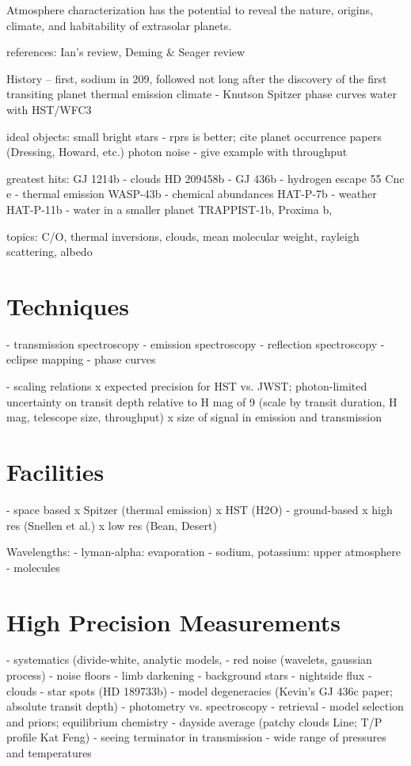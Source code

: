 \documentclass[graybox,natbib,nosecnum]{svmult}
\begin{document}
Atmosphere characterization has the potential to reveal the nature, origins, climate, and habitability of extrasolar planets.

references: Ian's review, Deming \& Seager review

History -- first, sodium in 209, followed not long after the discovery of the first transiting planet
		thermal emission 
		climate - Knutson Spitzer phase curves
		water with HST/WFC3

ideal objects:
	small bright stars - rprs is better; cite planet occurrence papers (Dressing, Howard, etc.)
	photon noise - give example with throughput

greatest hits:
	GJ 1214b - clouds
	HD 209458b -
	GJ 436b - hydrogen escape
	55 Cnc e - thermal emission
	WASP-43b - chemical abundances 
	HAT-P-7b - weather
	HAT-P-11b - water in a smaller planet 
	TRAPPIST-1b, Proxima b, 

topics:
	C/O, thermal inversions, clouds, mean molecular weight, rayleigh scattering, albedo

\section{Techniques} 
- transmission spectroscopy
- emission spectroscopy
- reflection spectroscopy
- eclipse mapping
- phase curves

- scaling relations
	x expected precision for HST vs. JWST; photon-limited uncertainty on transit depth relative to H mag of 9 (scale by transit duration, H mag, telescope size, throughput) 
	x size of signal in emission and transmission

\section{Facilities}
- space based
	x Spitzer (thermal emission)
	x HST (H2O)
- ground-based
	x high res (Snellen et al.)
	x low res  (Bean, Desert)

Wavelengths:
 - lyman-alpha: evaporation
 - sodium, potassium: upper atmosphere
 - molecules

\section{High Precision Measurements}
- systematics (divide-white, analytic models, 
- red noise (wavelets, gaussian process)
- noise floors
- limb darkening
- background stars
- nightside flux
- clouds
- star spots (HD 189733b)
- model degeneracies (Kevin's GJ 436c paper; absolute transit depth)
- photometry vs. spectroscopy
- retrieval
- model selection and priors; equilibrium chemistry
- dayside average (patchy clouds Line; T/P profile Kat Feng)
- seeing terminator in transmission - wide range of pressures and temperatures
\end{document}
